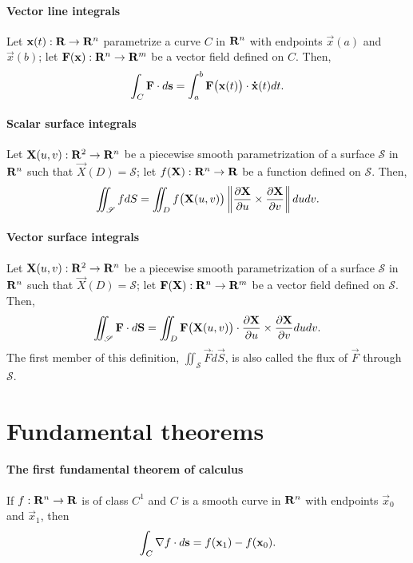 \documentclass[10pt,landscape]{article}
\begin{document}
\begin{multicols*}{3}
\paragraph{Vector line integrals}
Let $\mathbf{x}(t) : \mathbf{R} \to \mathbf{R}^n$ parametrize a curve $C$ in $\mathbf{R}^n$ with endpoints $\vec x(a)$ and $\vec x(b)$; let $\mathbf{F}(\mathbf{x}) : \mathbf{R}^n \to \mathbf{R}^m$ be a vector field defined on $C$.
Then,
\begin{equation}
  \int_C \vec F \dot d\vec s = \int_a^b \vec F\big(\vec x(t)\big) \dot \vec{\flux x}(t) dt.
\end{equation}

\paragraph{Scalar surface integrals}
Let $\mathbf{X}(u,v) : \mathbf{R}^2 \to \mathbf{R}^n$ be a piecewise smooth parametrization of a surface $\mathscr{S}$ in $\mathbf{R}^n$ such that $\vec X(D) = \mathscr{S}$; let $f(\mathbf{X}) : \mathbf{R}^n \to \mathbf{R}$ be a function defined on $\mathscr{S}$.
Then,
\begin{equation}
  \iint_\mathscr{S} fdS = \iint_D f\big(\mathbf{X}(u,v)\big) \left\lVert\frac{\partial\mathbf{X}}{\partial u} \times \frac{\partial\mathbf{X}}{\partial v}\right\rVert dudv.
\end{equation}

\paragraph{Vector surface integrals}
Let $\mathbf{X}(u,v) : \mathbf{R}^2 \to \mathbf{R}^n$ be a piecewise smooth parametrization of a surface $\mathscr{S}$ in $\mathbf{R}^n$ such that $\vec X(D) = \mathscr{S}$; let $\mathbf{F}(\mathbf{X}) : \mathbf{R}^n \to \mathbf{R}^m$ be a vector field defined on $\mathscr{S}$.
Then,
\begin{equation}
  \iint_\mathscr{S} \mathbf{F} \cdot d\mathbf{S} = \iint_D \mathbf{F}\big(\mathbf{X}(u,v)\big) \cdot \frac{\partial\mathbf{X}}{\partial u} \times \frac{\partial\mathbf{X}}{\partial v} dudv.
\end{equation}
The first member of this definition, $\iint_\mathscr{S} \vec F \dot d\vec S$, is also called the flux of $\vec F$ through $\mathscr{S}$.

\section{Fundamental theorems}
\paragraph{The first fundamental theorem of calculus}
If $f : \mathbf{R}^n \to \mathbf{R}$ is of class $C^1$ and $C$ is a smooth curve in $\mathbf{R}^n$ with endpoints $\vec x_0$ and $\vec x_1$, then
\begin{equation}
  \int_C \nabla f \cdot d\mathbf{s} = f(\mathbf{x}_1) - f(\mathbf{x}_0).
\end{equation}


\end{multicols*}
\end{document}
